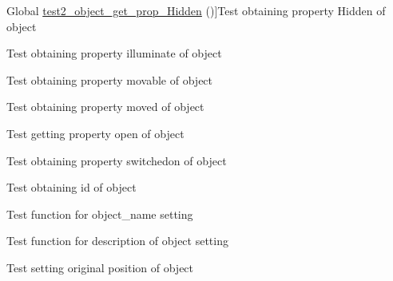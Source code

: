\begin{DoxyRefList}
\hypertarget{test__test000101}{}%
Global \hyperlink{object__test_8c_a2aa1c98ca2de8aab36614e37217a0907}{test2\+\_\+object\+\_\+get\+\_\+prop\+\_\+\+Hidden} ()]Test obtaining property Hidden of object  
\item[\label{test__test000080}%
\hypertarget{test__test000080}{}%
Global \hyperlink{object__test_8c_a689e4149735a5543014921c1579950a1}{test2\+\_\+object\+\_\+get\+\_\+prop\+\_\+\+Illuminate} ()]Test obtaining property illuminate of object  
\item[\label{test__test000070}%
\hypertarget{test__test000070}{}%
Global \hyperlink{object__test_8c_a2b377a9a92a83b71996a961426983bca}{test2\+\_\+object\+\_\+get\+\_\+prop\+\_\+\+Movable} ()]Test obtaining property movable of object  
\item[\label{test__test000075}%
\hypertarget{test__test000075}{}%
Global \hyperlink{object__test_8c_a6c5952b03a7737bb7b44ae4a63a8ff0b}{test2\+\_\+object\+\_\+get\+\_\+prop\+\_\+\+Moved} ()]Test obtaining property moved of object  
\item[\label{test__test000090}%
\hypertarget{test__test000090}{}%
Global \hyperlink{object__test_8c_a300abd0f902e0c5865a1351dbb6e65c4}{test2\+\_\+object\+\_\+get\+\_\+prop\+\_\+\+Open} ()]Test getting property open of object  
\item[\label{test__test000085}%
\hypertarget{test__test000085}{}%
Global \hyperlink{object__test_8c_a1a023ed883d17c1fd32b924548306cf4}{test2\+\_\+object\+\_\+get\+\_\+prop\+\_\+\+Switched\+On} ()]Test obtaining property switchedon of object  
\item[\label{test__test000067}%
\hypertarget{test__test000067}{}%
Global \hyperlink{object__test_8c_a1f0cfd69428a6cf954fe37c9c21f8cb3}{test2\+\_\+object\+\_\+set\+\_\+id} ()]Test obtaining id of object  
\item[\label{test__test000057}%
\hypertarget{test__test000057}{}%
Global \hyperlink{object__test_8c_acf42b7e7be91ede243f2aaa56c4c9347}{test2\+\_\+object\+\_\+set\+\_\+name} ()]Test function for object\+\_\+name setting  
\item[\label{test__test000062}%
\hypertarget{test__test000062}{}%
Global \hyperlink{object__test_8c_a9f99963e555263ceef814fec86db4758}{test2\+\_\+object\+\_\+set\+\_\+original\+\_\+description} ()]Test function for description of object setting  
\item[\label{test__test000098}%
\hypertarget{test__test000098}{}%
Global \hyperlink{object__test_8c_a64501207ceb4c2481bb45a334c71668f}{test2\+\_\+object\+\_\+set\+\_\+original\+\_\+position} ()]Test setting original position of object  

\end{DoxyRefList}
